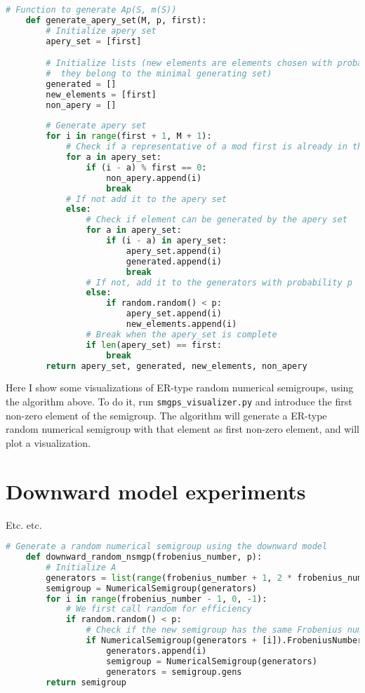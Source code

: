 \begin{lstlisting}[language=Python]
    # Function to generate Ap(S, m(S))
    def generate_apery_set(M, p, first): 
        # Initialize apery set
        apery_set = [first]

        # Initialize lists (new elements are elements chosen with probability p,
        #  they belong to the minimal generating set)
        generated = []
        new_elements = [first]
        non_apery = []
        
        # Generate apery set
        for i in range(first + 1, M + 1):
            # Check if a representative of a mod first is already in the apery set
            for a in apery_set:
                if (i - a) % first == 0:
                    non_apery.append(i)
                    break
            # If not add it to the apery set
            else:
                # Check if element can be generated by the apery set
                for a in apery_set: 
                    if (i - a) in apery_set:
                        apery_set.append(i)
                        generated.append(i)
                        break 
                # If not, add it to the generators with probability p
                else:
                    if random.random() < p:
                        apery_set.append(i)
                        new_elements.append(i)
                # Break when the apery_set is complete 
                if len(apery_set) == first:
                    break
        return apery_set, generated, new_elements, non_apery
\end{lstlisting}

Here I show some visualizations of ER-type random numerical semigroups, using the algorithm above. To do it, run \verb|smgps_visualizer.py| and introduce the first non-zero element of the semigroup. The algorithm will generate a ER-type random numerical semigroup with that element as first non-zero element, and will plot a visualization. 



\section{Downward model experiments}\label{sec:experiments:downward model}

Etc. etc.


\begin{lstlisting}[language=Python]
    # Generate a random numerical semigroup using the downward model
    def downward_random_nsmgp(frobenius_number, p):
        # Initialize A
        generators = list(range(frobenius_number + 1, 2 * frobenius_number + 2))
        semigroup = NumericalSemigroup(generators)
        for i in range(frobenius_number - 1, 0, -1):
            # We first call random for efficiency
            if random.random() < p:
                # Check if the new semigroup has the same Frobenius number
                if NumericalSemigroup(generators + [i]).FrobeniusNumber() == frobenius_number:
                    generators.append(i)
                    semigroup = NumericalSemigroup(generators)
                    generators = semigroup.gens
        return semigroup
\end{lstlisting}

